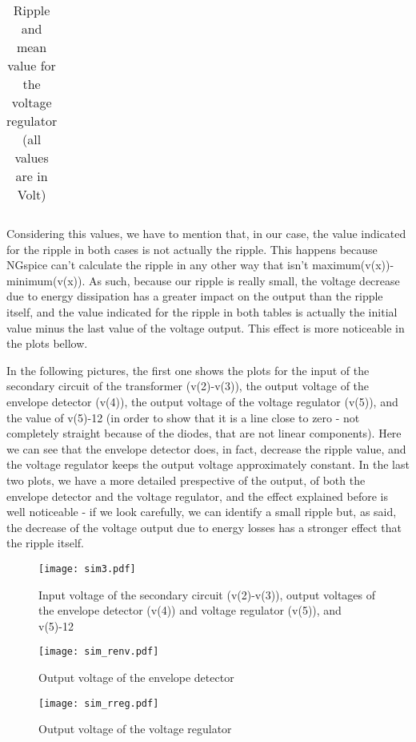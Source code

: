 \begin{table}[H]
\centering
\begin{tabularx}{0.9\textwidth} {
  | >{\raggedright\arraybackslash}X
  | >{\raggedleft\arraybackslash}X | }
 \hline

\end{tabularx}
\caption{\label{tab:Table 5} Ripple and mean value for the voltage regulator (all values are in Volt)}
\end{table}
\vspace{5mm}

\par Considering this values, we have to mention that, in our case, the value indicated for the ripple in both cases is not actually the ripple. This happens because NGspice can't calculate the ripple in any other way that isn't maximum(v(x))-minimum(v(x)). As such, because our ripple is really small, the voltage decrease due to energy dissipation has a greater impact on the output than the ripple itself, and the value indicated for the ripple in both tables is actually the initial value minus the last value of the voltage output. This effect is more noticeable in the plots bellow.
\par In the following pictures, the first one shows the plots for the input of the secondary circuit of the transformer (v(2)-v(3)), the output voltage of the envelope detector (v(4)), the output voltage of the voltage regulator (v(5)), and the value of v(5)-12 (in order to show that it is a line close to zero - not completely straight because of the diodes, that are not linear components). Here we can see that the envelope detector does, in fact, decrease the ripple value, and the voltage regulator keeps the output voltage approximately constant. In the last two plots, we have a more detailed prespective of the output, of both the envelope detector and the voltage regulator, and the effect explained before is well noticeable - if we look carefully, we can identify a small ripple but, as said, the decrease of the voltage output due to energy losses has a stronger effect that the ripple itself.


\begin{figure}[H] \centering
\texttt{[image: sim3.pdf]}
\caption{Input voltage of the secondary circuit (v(2)-v(3)), output voltages of the envelope detector (v(4)) and voltage regulator (v(5)), and v(5)-12}
\end{figure}

\begin{figure}[H] \centering
\texttt{[image: sim\_renv.pdf]}
\caption{Output voltage of the envelope detector}
\end{figure}

\begin{figure}[H] \centering
\texttt{[image: sim\_rreg.pdf]}
\caption{Output voltage of the voltage regulator}
\end{figure}
